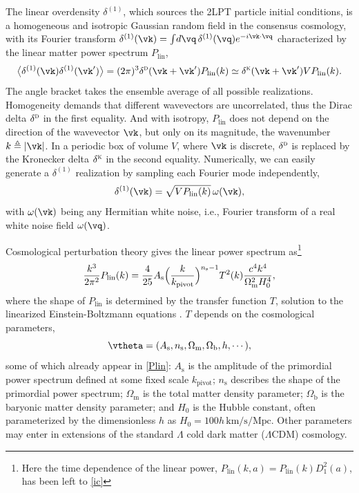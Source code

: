 \documentclass[modern, trackchanges, dvipsnames]{aastex631}
\newcommand{\deltaD}{\delta^\textsc{d}}
\newcommand{\deltaK}{\delta^\textsc{k}}
\renewcommand{\d}{d}
\newcommand{\As}{A_\mathrm{s}}
\newcommand{\ns}{n_\mathrm{s}}
\newcommand{\Omegam}{\Omega_\mathrm{m}}
\newcommand{\Omegab}{\Omega_\mathrm{b}}
\newcommand{\Mpc}{\mathrm{Mpc}}
\newcommand{\Plin}{P_\mathrm{lin}}
\begin{document}
The linear overdensity $\delta^{(1)}$, which sources the 2LPT particle
initial conditions, is a homogeneous and isotropic Gaussian random field
in the consensus cosmology, with its Fourier transform
$\delta^{(1)}(\vk) = \int\!\d\vq\, \delta^{(1)}(\vq) e^{- i \vk \cdot
\vq}$ characterized by the linear matter power spectrum $\Plin$,
%
\begin{equation}
\bigl\langle \delta^{(1)}(\vk) \delta^{(1)}(\vk') \bigr\rangle
= (2\pi)^3 \deltaD(\vk + \vk') \Plin(k)
\simeq \deltaK(\vk + \vk') V \Plin(k).
\end{equation}
%
The angle bracket takes the ensemble average of all possible
realizations.
Homogeneity demands that different wavevectors are uncorrelated, thus
the Dirac delta $\deltaD$ in the first equality.
And with isotropy, $\Plin$ does not depend on the direction of the
wavevector $\vk$, but only on its magnitude, the wavenumber $k
\triangleq |\vk|$.
In a periodic box of volume $V$, where $\vk$ is discrete, $\deltaD$ is
replaced by the Kronecker delta $\deltaK$ in the second equality.
Numerically, we can easily generate a $\delta^{(1)}$ realization by
sampling each Fourier mode independently,
%
\begin{equation}
\delta^{(1)}(\vk) = \sqrt{V \Plin(k)} \, \omega(\vk),
\end{equation}
%
with $\omega(\vk)$ being any Hermitian white noise, i.e., Fourier
transform of a real white noise field $\omega(\vq)$.

Cosmological perturbation theory gives the linear power spectrum
as\footnote{Here the time dependence of the linear power, $\Plin(k, a) =
\Plin(k) D_1^2(a)$, has been left to \eqref{ic}}
%
\begin{equation}
\frac{k^3}{2\pi^2} \Plin(k)
= \frac{4}{25} \As
  \Bigl( \frac{k}{k_\mathrm{pivot}} \Bigr)^{\ns - 1}
  T^2(k) \frac{c^4 k^4}{\Omegam^2 H_0^4},
\label{Plin}
\end{equation}
%
where the shape of $\Plin$ is determined by the transfer function $T$,
solution to the linearized Einstein-Boltzmann equations \citep{CAMB,
CLASS}.
$T$ depends on the cosmological parameters,
%
\begin{equation*}
\vtheta = (
  \As, \ns, \Omegam, \Omegab, h, \cdots),
\end{equation*}
%
some of which already appear in \eqref{Plin}: $\As$ is the amplitude of
the primordial power spectrum defined at some fixed scale
$k_\mathrm{pivot}$; $\ns$ describes the shape of the primordial power
spectrum; $\Omegam$ is the total matter density parameter; $\Omegab$ is
the baryonic matter density parameter; and $H_0$ is the Hubble constant,
often parameterized by the dimensionless $h$ as $H_0 = 100 h \,
\mathrm{km}/\mathrm{s}/\Mpc$.
Other parameters may enter in extensions of the standard $\Lambda$ cold
dark matter ($\Lambda$CDM) cosmology.
\end{document}

